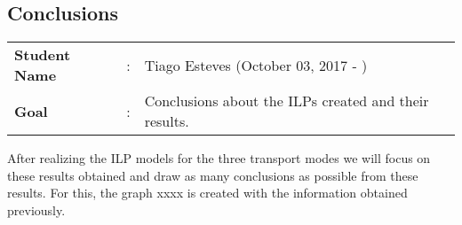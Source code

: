 \clearpage

\subsection{Conclusions}
\begin{tcolorbox}	
\begin{tabular}{p{2.75cm} p{0.2cm} p{10.5cm}} 	
\textbf{Student Name}  &:& Tiago Esteves    (October 03, 2017 - )\\
\textbf{Goal}          &:& Conclusions about the ILPs created and their results.
\end{tabular}
\end{tcolorbox}
\vspace{11pt}

After realizing the ILP models for the three transport modes we will focus on these results obtained and draw as many conclusions as possible from these results. For this, the graph xxxx is created with the information obtained previously.\\
